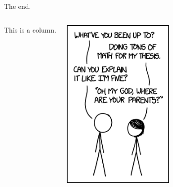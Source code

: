 \documentclass{beamer}
\begin{document}
\begin{frame}{The end.}
    \begin{columns}
        This is a column.

        \includegraphics[width=0.9\textwidth]{Figures/meme.png}
    \end{columns}


\end{frame}
\end{document}
